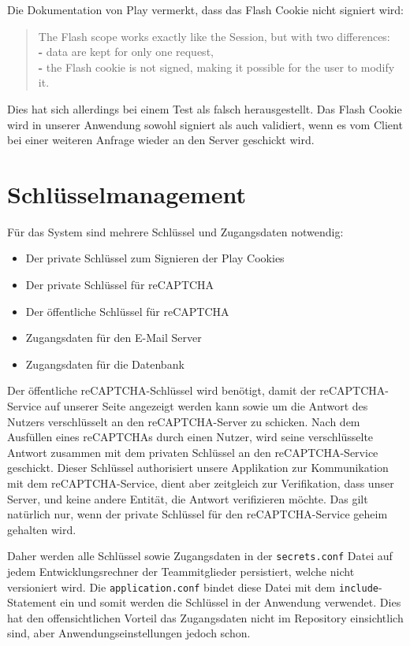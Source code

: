 \documentclass[12pt,DIV14,BCOR10mm,a4paper,parskip=half-,headsepline,headinclude,english,ngerman,bibliography=totocnumbered]{scrreprt}
\begin{document}
Die Dokumentation von Play vermerkt, dass das Flash Cookie nicht signiert wird:
\blockquote{
The Flash scope works exactly like the Session, but with two differences: \\
\textbf{-} data are kept for only one request, \\
\textbf{-} the Flash cookie is not signed, making it possible for the user to modify it. \autocite{JavaPlayFlashDocu}
}
Dies hat sich allerdings bei einem Test als falsch herausgestellt. Das Flash Cookie wird in unserer Anwendung sowohl signiert als auch validiert, wenn es vom Client bei einer weiteren Anfrage wieder an den Server geschickt wird.

\section{Schlüsselmanagement}
Für das System sind mehrere Schlüssel und Zugangsdaten notwendig:

\begin{itemize}
	\item Der private Schlüssel zum Signieren der Play Cookies
	\item Der private Schlüssel für reCAPTCHA
	\item Der öffentliche Schlüssel für reCAPTCHA
	\item Zugangsdaten für den E-Mail Server
	\item Zugangsdaten für die Datenbank
\end{itemize}

Der öffentliche reCAPTCHA-Schlüssel wird benötigt, damit der reCAPTCHA-Service auf unserer Seite angezeigt werden kann sowie um die Antwort des Nutzers verschlüsselt an den reCAPTCHA-Server zu schicken.
Nach dem Ausfüllen eines reCAPTCHAs durch einen Nutzer, wird seine verschlüsselte Antwort zusammen mit dem privaten Schlüssel an den reCAPTCHA-Service geschickt.
Dieser Schlüssel authorisiert unsere Applikation zur Kommunikation mit dem reCAPTCHA-Service, dient aber zeitgleich zur Verifikation, dass unser Server, und keine andere Entität, die Antwort verifizieren möchte.
Das gilt natürlich nur, wenn der private Schlüssel für den reCAPTCHA-Service geheim gehalten wird.
\par
Daher werden alle Schlüssel sowie Zugangsdaten in der \texttt{secrets.conf} Datei auf jedem Entwicklungsrechner der Teammitglieder persistiert, welche nicht versioniert wird. Die \texttt{application.conf} bindet diese Datei mit dem \texttt{include}-Statement ein und somit werden die Schlüssel in der Anwendung verwendet. Dies hat den offensichtlichen Vorteil das Zugangsdaten nicht im Repository einsichtlich sind, aber Anwendungseinstellungen jedoch schon.
\end{document}
